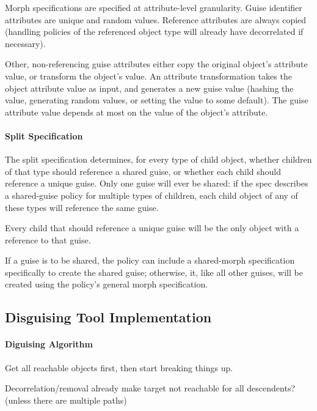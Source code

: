 Morph specifications are specified at attribute-level granularity. Guise identifier attributes are
unique and random values.  Reference attributes are always copied (handling policies of the
referenced object type will already have decorrelated if necessary).

Other, non-referencing guise attributes either copy the original object's attribute value, or
transform the object's value.  An attribute transformation takes the object attribute value as
input, and generates a new guise value (\eg hashing the value, generating random values, or setting
the value to some default).  The guise attribute value depends at most on the value of the object's
attribute.

\paragraph{Split Specification}
The split specification determines, for every type of child object, whether children of that type
should reference a shared guise, or whether each child should reference a unique guise.  Only one
guise will ever be shared: if the spec describes a shared-guise policy for multiple types of
children, each child object of any of these types will reference the same guise.

Every child that should reference a unique guise will be the only object with a reference to that guise.

If a guise is to be shared, the policy can include a shared-morph specification specifically to
create the shared guise; otherwise, it, like all other guises, will be created using the policy's
general morph specification.

\subsection{Disguising Tool Implementation}

\paragraph{Diguising Algorithm}
Get all reachable objects first, then start breaking things up.

Decorrelation/removal already make target not reachable for all descendents? (unless there are
multiple paths)

